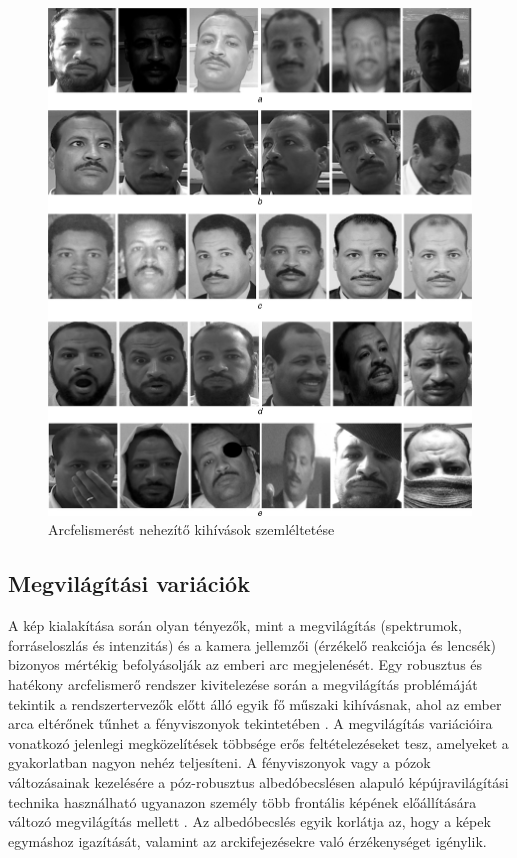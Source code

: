 \begin{figure}
	\includegraphics[width=\textwidth]{figures/facedetection_challenge.jpeg}
	\caption{Arcfelismerést nehezítő kihívások szemléltetése \cite{9}}
	\label{fig:face2}
\end{figure}

\newpage

\subsection{Megvilágítási variációk}
A kép kialakítása során olyan tényezők, mint a megvilágítás (spektrumok, forráseloszlás és intenzitás) és a kamera jellemzői (érzékelő reakciója és lencsék) bizonyos mértékig befolyásolják az emberi arc megjelenését.
Egy robusztus és hatékony arcfelismerő rendszer kivitelezése során a megvilágítás problémáját tekintik a rendszertervezők előtt álló egyik fő műszaki kihívásnak, ahol az ember arca eltérőnek tűnhet a fényviszonyok tekintetében \cite{11}.
A megvilágítás variációira vonatkozó jelenlegi megközelítések többsége erős feltételezéseket tesz, amelyeket a gyakorlatban nagyon nehéz teljesíteni.
A fényviszonyok vagy a pózok változásainak kezelésére a póz-robusztus albedóbecslésen alapuló képújravilágítási technika használható ugyanazon személy több frontális képének előállítására változó megvilágítás mellett \cite{12}. Az albedóbecslés egyik korlátja az, hogy a képek egymáshoz igazítását, valamint az arckifejezésekre való érzékenységet igénylik.


